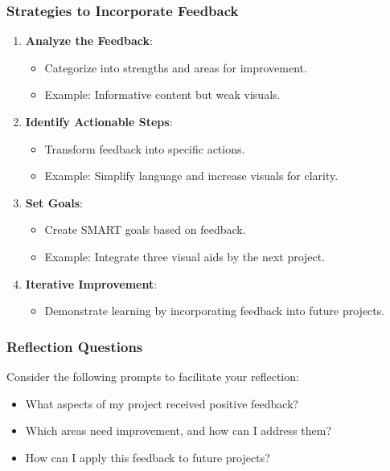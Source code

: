 \documentclass{beamer}
\begin{document}
\begin{frame}[fragile]
    \frametitle{Strategies to Incorporate Feedback}
    \begin{enumerate}
        \item \textbf{Analyze the Feedback}:
            \begin{itemize}
                \item Categorize into strengths and areas for improvement.
                \item Example: Informative content but weak visuals.
            \end{itemize}
        \item \textbf{Identify Actionable Steps}:
            \begin{itemize}
                \item Transform feedback into specific actions.
                \item Example: Simplify language and increase visuals for clarity.
            \end{itemize}
        \item \textbf{Set Goals}:
            \begin{itemize}
                \item Create SMART goals based on feedback.
                \item Example: Integrate three visual aids by the next project.
            \end{itemize}
        \item \textbf{Iterative Improvement}:
            \begin{itemize}
                \item Demonstrate learning by incorporating feedback into future projects.
            \end{itemize}
    \end{enumerate}
\end{frame}

\begin{frame}[fragile]
    \frametitle{Reflection Questions}
    Consider the following prompts to facilitate your reflection:
    \begin{itemize}
        \item What aspects of my project received positive feedback?
        \item Which areas need improvement, and how can I address them?
        \item How can I apply this feedback to future projects?
    \end{itemize}
\end{frame}
\end{document}
